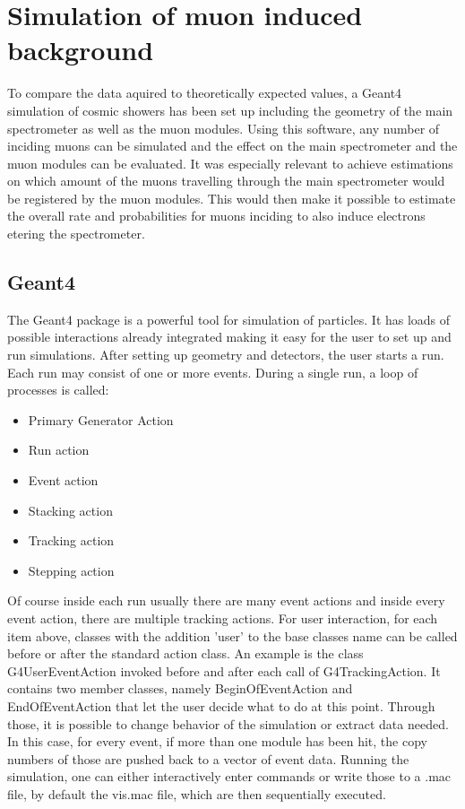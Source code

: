 
\chapter{Simulation of muon induced background}
\label{ch:Simulation of muon induced background}
  To compare the data aquired to theoretically expected values, a Geant4 simulation of cosmic showers has been set up including the geometry of the main spectrometer as well as the muon modules. Using this software, any number of inciding muons can be simulated and the effect on the main spectrometer and the muon modules can be evaluated. It was especially relevant to achieve estimations on which amount of the muons travelling through the main spectrometer would be registered by the muon modules. This would then make it possible to estimate the overall rate and probabilities for muons inciding to also induce electrons etering the spectrometer.
  \section{Geant4}
  \label{ch:Simulation software:sec:Geant4}
  The Geant4 package is a powerful tool for simulation of particles. It has loads of possible interactions already integrated making it easy for the user to set up and run simulations. After setting up geometry and detectors, the user starts a run. Each run may consist of one or more events. During a single run, a loop of processes is called:
  \begin{itemize}	
  	\item Primary Generator Action
  	\item Run action
  	\item Event action
  	\item Stacking action
  	\item Tracking action
  	\item Stepping action
  \end{itemize}
  Of course inside each run usually there are many event actions and inside every event action, there are multiple tracking actions.
  For user interaction, for each item above, classes with the addition 'user' to the base classes name can be called before or after the standard action class. An example is the class G4UserEventAction invoked before and after each call of G4TrackingAction. It contains two member classes, namely BeginOfEventAction and EndOfEventAction that let the user decide what to do at this point. Through those, it is possible to change behavior of the simulation or extract data needed. In this case, for every event, if more than one module has been hit, the copy numbers of those are pushed back to a vector of event data.  
  Running the simulation, one can either interactively enter commands or write those to a .mac file, by default the vis.mac file, which are then sequentially executed.
  


